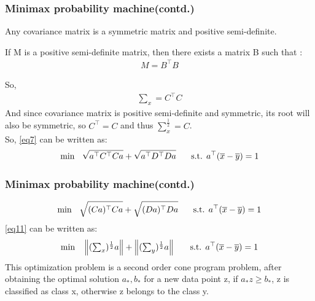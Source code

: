 \documentclass{beamer}
\newcommand\norm[1]{\left\lVert#1\right\rVert}
\begin{document}
\begin{frame}[fragile]
\frametitle{Minimax probability machine(contd.)}
Any covariance matrix is a symmetric matrix and positive semi-definite.\\
\begin{block}{}
 If M is a positive semi-definite matrix, then there exists a matrix B such that :
\begin{align}
    M=B^{\top}B
\end{align}
\end{block}

So, 
\begin{align}
    \textstyle \sum_{x} = C^{\top}C
\end{align}
And since covariance matrix is positive semi-definite and symmetric, its root will also be symmetric, so $C^{\top}=C$ and thus $\sum_x^{\frac{1}{2}}=C$.\\


So, \eqref{eq7} can be written as:
\begin{align}
    \text{min  }\hspace{.2cm} \sqrt{a^{\top}C^{\top}C a}+\sqrt{a^{\top}D^{\top}D a} \hspace{.5cm} \text{ s.t. } a^{\top}(\overline{x}-\overline{y})=1
\end{align}
\end{frame}
\begin{frame}[fragile]
\frametitle{Minimax probability machine(contd.)}
\begin{align}
    \text{min  }\hspace{.2cm} \sqrt{(Ca)^{\top}C a}+\sqrt{(Da)^{\top}D a} \hspace{.5cm} \text{ s.t. } a^{\top}(\overline{x}-\overline{y})=1 \label{eq11}
\end{align}
\eqref{eq11} can be written as:
    \begin{align}
    \text{min  }\hspace{.2cm} \norm{(\textstyle \sum_{x})^{\frac{1}{2}} a}+ \norm{(\textstyle \sum_{y})^{\frac{1}{2}} a} \hspace{.5cm} \text{ s.t. } a^{\top}(\overline{x}-\overline{y})=1
\end{align}
 This optimization problem is a second order cone program problem, after obtaining the optimal solution $a_{*},b_{*}$ for a new data point z, if $a_{*}z\geq b_{*}$, z is classified as class x, otherwise z belongs to the class y.
\end{frame}
\end{document}
